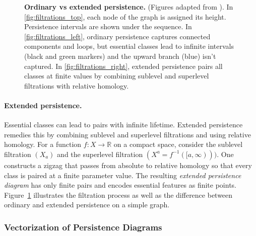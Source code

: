 \begin{figure}[t]
  \caption{\textbf{Ordinary vs extended persistence.} (Figures adapted from \cite{perslay}). In \ref{fig:filtrations_top}, each node of the graph is assigned its height. Persistence intervals are shown under the sequence. In \ref{fig:filtrations_left}, ordinary persistence captures connected components and loops, but essential classes lead to infinite intervals (black and green markers) and the upward branch (blue) isn't captured. In \ref{fig:filtrations_right}, extended persistence pairs all classes at finite values by combining sublevel and superlevel filtrations with relative homology.}
  \label{fig:filtrations}
\end{figure}


\paragraph{Extended persistence.}
Essential classes can lead to pairs with infinite lifetime. Extended persistence remedies this by combining sublevel and superlevel filtrations and using relative homology. For a function $f:X\to\mathbb{R}$ on a compact space, consider the sublevel filtration $(X_a)$ and the superlevel filtration $(X^a = f^{-1}([a,\infty)))$. One constructs a zigzag that passes from absolute to relative homology so that every class is paired at a finite parameter value. The resulting \emph{extended persistence diagram} has only finite pairs and encodes essential features as finite points. Figure~\ref{fig:filtrations} illustrates the filtration process as well as the difference between ordinary and extended persistence on a simple graph.


\subsubsection{Vectorization of Persistence Diagrams}
\label{sssec:vectorization_persistence_diagrams}

